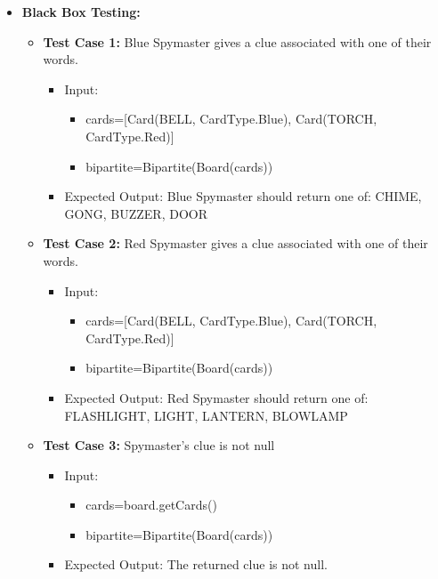 \documentclass[12pt]{article}
\begin{document}
\begin{itemize}
    \item \textbf{Black Box Testing:}
    \begin{itemize}
        \item \textbf{Test Case 1:} Blue Spymaster gives a clue associated with one of their words.
            \begin{itemize}
            \item Input: 
                \begin{itemize}
                    \item cards=[Card(BELL, CardType.Blue), Card(TORCH, CardType.Red)]
                    \item bipartite=Bipartite(Board(cards))
                \end{itemize}
            \item Expected Output: Blue Spymaster should return one of: CHIME, GONG, BUZZER, DOOR
        \end{itemize}
        \item \textbf{Test Case 2:} Red Spymaster gives a clue associated with one of their words.
        \begin{itemize}
            \item Input: 
                \begin{itemize}
                    \item cards=[Card(BELL, CardType.Blue), Card(TORCH, CardType.Red)]
                    \item bipartite=Bipartite(Board(cards))
                \end{itemize}
            \item Expected Output: Red Spymaster should return one of: FLASHLIGHT, LIGHT, LANTERN, BLOWLAMP
        \end{itemize}
        \item \textbf{Test Case 3:} Spymaster's clue is not null
            \begin{itemize}
                \item Input:
                \begin{itemize}
                    \item cards=board.getCards()
                    \item bipartite=Bipartite(Board(cards))
                \end{itemize}
                \item Expected Output: The returned clue is not null.
            \end{itemize}
    \end{itemize}
\end{itemize}
\end{document}
